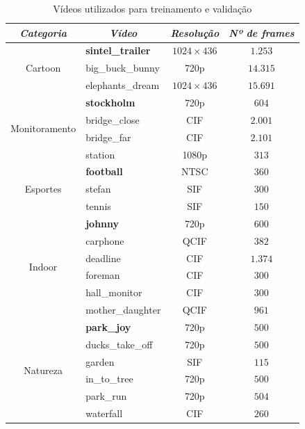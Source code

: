 \documentclass[cic,tc]{iiufrgs}
\begin{document}
\begin{table}[h]
    \caption{Vídeos utilizados para treinamento e validação}
    \centering
        \begin{tabular}{|c|l|c|c|}
          \hline
          \multicolumn{1}{|c}{\textit{Categoria}} & 
          \multicolumn{1}{|c}{\textit{Vídeo}} & 
          \multicolumn{1}{|c}{\textit{Resolução}} & 
          \multicolumn{1}{|c|}{\textit{Nº de frames}}  \\
          \hline
          \hline
          \multirow{3}{*}{Cartoon} 
          & \textbf{sintel\_trailer} & $1024\times436$ & $ 1.253 $ \\ 
          & big\_buck\_bunny & 720p & $ 14.315 $ \\
          & elephants\_dream & $1024\times436$ & $ 15.691 $ \\
          \hline
          \multirow{4}{*}{Monitoramento} 
          & \textbf{stockholm} & 720p & $604$ \\ 
          & bridge\_close & CIF & $2.001$ \\
          & bridge\_far & CIF & $2.101$ \\
          & station & 1080p & $313$ \\
          \hline 
          \multirow{3}{*}{Esportes} 
          & \textbf{football} & NTSC & $360$ \\
          & stefan & SIF & $300$ \\ 
          & tennis & SIF & $150$ \\
          \hline
          \multirow{6}{*}{Indoor} 
          & \textbf{johnny} & 720p & $600$ \\ 
          & carphone & QCIF & $382$ \\
          & deadline & CIF & $1.374$ \\
          & foreman & CIF & $300$ \\
          & hall\_monitor & CIF & $300$ \\
          & mother\_daughter & QCIF & $961$ \\
          \hline
          \multirow{6}{*}{Natureza} 
          & \textbf{park\_joy} & 720p & $500$ \\
          & ducks\_take\_off & 720p & $500$ \\
          & garden & SIF & $115$ \\
          & in\_to\_tree & 720p & $500$ \\
          & park\_run & 720p & $504$ \\
          & waterfall & CIF & $260$ \\
          \hline
        \end{tabular}
    \label{tbl:vidtrain}
\end{table}
\end{document}
